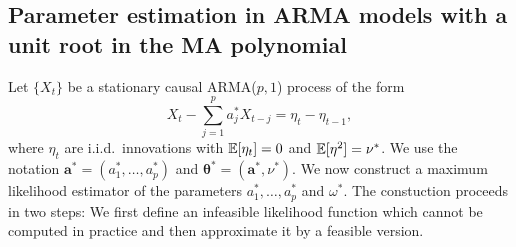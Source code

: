 


\newpage
\subsection{Parameter estimation in ARMA models with a unit root in the MA polynomial}


Let $\{X_t\}$ be a stationary causal ARMA($p,1$) process of the form 
\begin{equation}
X_t - \sum\limits_{j=1}^p a_j^* X_{t-j} = \eta_t - \eta_{t-1},
\end{equation}
where $\eta_t$ are i.i.d.\ innovations with $\mathbb{E}[\eta_t] = 0$ and $\mathbb{E}[\eta^2] = \nu^*$. We use the notation $\boldsymbol{a}^* = (a_1^*,\ldots,a_p^*)$ and $\boldsymbol{\theta}^* = (\boldsymbol{a}^*,\nu^*)$. We now construct a maximum likelihood estimator of the parameters $a_1^*,\ldots,a_p^*$ and $\omega^*$. The constuction proceeds in two steps: We first define an infeasible likelihood function which cannot be computed in practice and then approximate it by a feasible version. 
\vspace{10pt}


